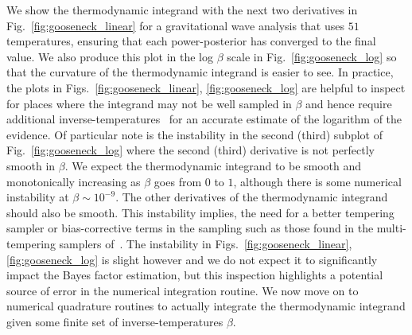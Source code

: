 We show the thermodynamic integrand with the next two derivatives in Fig.~\ref{fig:gooseneck_linear} for a gravitational wave analysis that uses $51$ temperatures, ensuring that each power-posterior has converged to the final value. We also produce this plot in the log $\beta$ scale in Fig.~\ref{fig:gooseneck_log} so that the curvature of the thermodynamic integrand is easier to see. In practice, the plots in Figs.~\ref{fig:gooseneck_linear}, \ref{fig:gooseneck_log} are helpful to inspect for places where the integrand may not be well sampled in $\beta$ and hence require additional inverse-temperatures~\cite{liu2016evaluating, de2011free, de2013comparison} for an accurate estimate of the logarithm of the evidence. Of particular note is the instability in the second (third) subplot of Fig.~\ref{fig:gooseneck_log} where the second (third) derivative is not perfectly smooth in $\beta$. We expect the thermodynamic integrand to be smooth and monotonically increasing as $\beta$ goes from $0$ to $1$\cite{annis2019thermodynamic}, although there is some numerical instability at $\beta \sim 10^{-9}$. The other derivatives of the thermodynamic integrand should also be smooth. This instability implies, the need for a better tempering sampler or bias-corrective terms in the sampling such as those found in the multi-tempering samplers of~\cite{oates2017control,evans2019thermodynamic}. The instability in Figs.~\ref{fig:gooseneck_linear}, \ref{fig:gooseneck_log} is slight however and we do not expect it to significantly impact the Bayes factor estimation, but this inspection highlights a potential source of error in the numerical integration routine. We now move on to numerical quadrature routines to actually integrate the thermodynamic integrand given some finite set of inverse-temperatures $\beta$. 

